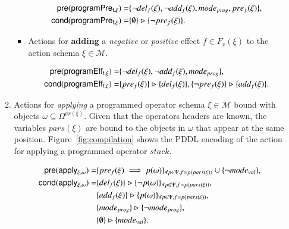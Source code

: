 \documentclass[3p,times]{elsarticle}
\newcommand{\pre}{\mathsf{pre}}  %
\newcommand{\cond}{\mathsf{cond}}   %
\begin{document}
\begin{itemize}
\begin{enumerate}
\begin{itemize}
\begin{small}
\begin{align*}
\hspace*{7pt}\pre(\mathsf{programPre_{f,\xi}})=&\{\neg del_{f}(\xi),\neg add_{f}(\xi), mode_{prog}, pre_{f}(\xi)\},\\
\cond(\mathsf{programPre_{f,\xi}})=&\{\emptyset\}\rhd\{\neg pre_{f}(\xi)\}.
\end{align*}
\end{small}

\item Actions for {\bf adding} a {\em negative} or {\em positive} effect $f\in F_v(\xi)$ to the action schema $\xi\in\mathcal{M}$.

\begin{small}
\begin{align*}
\hspace*{7pt}\pre(\mathsf{programEff_{f,\xi}})=&\{\neg del_{f}(\xi),\neg add_{f}(\xi), mode_{prog}\},\\
\cond(\mathsf{programEff_{f,\xi}})=&\{pre_{f}(\xi)\}\rhd\{del_{f}(\xi)\},\{\neg pre_{f}(\xi)\}\rhd\{add_{f}(\xi)\}.
\end{align*}
\end{small}
\end{itemize}

\item Actions for {\em applying} a programmed operator schema $\xi\in\mathcal{M}$ bound with objects $\omega\subseteq\Omega^{ar(\xi)}$. Given that the operators headers are known, the variables $pars(\xi)$ are bound to the objects in $\omega$ that appear at the same position. Figure~\ref{fig:compilation} shows the PDDL encoding of the action for applying a programmed operator $stack$.
\begin{small}
\begin{align*}
\hspace*{7pt}\pre(\mathsf{apply_{\xi,\omega}})=&\{pre_{f}(\xi)\implies p(\omega)\}_{\forall p\in\Psi,f=p(pars(\xi))}\cup \{\neg mode_{val}\},\\
\cond(\mathsf{apply_{\xi,\omega}})=&\{del_{f}(\xi)\}\rhd\{\neg p(\omega)\}_{\forall p\in\Psi,f=p(pars(\xi))},\\
&\{add_{f}(\xi)\}\rhd\{p(\omega)\}_{\forall p\in\Psi,f=p(pars(\xi))},\\
&\{mode_{prog}\}\rhd\{\neg mode_{prog}\},\\
&\{\emptyset\}\rhd\{mode_{val}\}.
\end{align*}
\end{small}


\end{enumerate}
\end{itemize}
\end{document}
